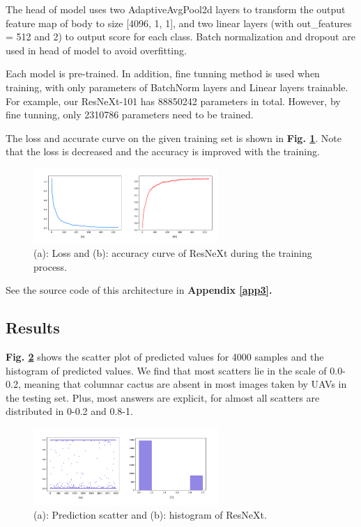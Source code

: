 \documentclass[10pt,twocolumn,letterpaper]{article}
\begin{document}
The head of model uses two AdaptiveAvgPool2d layers to transform the output feature map of body to size [4096, 1, 1], and two linear layers (with out\_features = 512 and 2) to output score for each class. Batch normalization and dropout are used in head of model to avoid overfitting.

Each model is pre-trained. In addition, fine tunning method is used when training, with only parameters of BatchNorm layers and Linear layers trainable. For example, our \textsf{ResNeXt-101} has 88850242 parameters in total. However, by fine tunning, only 2310786 parameters need to be trained.

The loss and accurate curve on the given training set is shown in \textbf{Fig. \ref{resxacc}}. Note that the loss is decreased and the accuracy is improved with the training.

\begin{figure}[h]
\centering
\includegraphics[width=7cm]{resx_acc.pdf}
\caption{(a): Loss and (b): accuracy curve of \textsf{ResNeXt} during the training process.}
\label{resxacc}
\end{figure}

See the source code of this architecture in \textbf{Appendix \ref{app3}.}

\subsection{Results}

\textbf{Fig. \ref{resxresults}} shows the scatter plot of predicted values for 4000 samples and the histogram of predicted values. We find that most scatters lie in the scale of 0.0-0.2, meaning that columnar cactus are absent in most images taken by UAVs in the testing set. Plus, most answers are explicit, for almost all scatters are distributed in 0-0.2 and 0.8-1.

\begin{figure}[h]
\centering
\includegraphics[width=7cm]{resx_best.pdf}
\caption{(a): Prediction scatter and (b): histogram of \textsf{ResNeXt}.}
\label{resxresults}
\end{figure}
\end{document}
